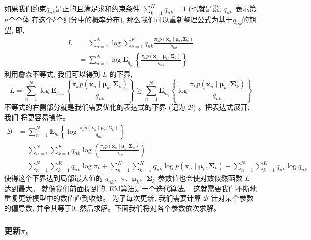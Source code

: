 \documentclass[UTF8]{ctexart}
\numberwithin{equation}{section}
\begin{document}
如果我们约束$q_{n k}$是正的且满足求和约束条件
$\sum_{k=1}^{K} q_{n k}=1$ 
(也就是说, $q_{nk}$ 表示第$n$个个体
在这个$k$个组分中的概率分布), 
那么我们可以重新整理公式为基于$q_{nk}$的期望, 即,
$$
\begin{aligned}
L &=\sum_{n=1}^{N} \log \sum_{k=1}^{K} q_{n k} \frac{\pi_{k} p\left(\boldsymbol{x}_{n} \mid \boldsymbol{\mu}_{k}, \boldsymbol{\Sigma}_{k}\right)}{q_{n k}} \\
&=\sum_{n=1}^{N} \log \boldsymbol{E}_{q_{\mu_{k}}}\left\{\frac{\pi_{k} p\left(\boldsymbol{x}_{n} \mid \boldsymbol{\mu}_{k}, \boldsymbol{\Sigma}_{k}\right)}{q_{n k}}\right\}
\end{aligned}
$$
利用詹森不等式, 我们可以得到 $L$ 的下界,
$$
L=\sum_{n=1}^{N} \log \boldsymbol{E}_{q_{m *}}\left\{\frac{\pi_{k} p\left(\boldsymbol{x}_{n} \mid \boldsymbol{\mu}_{k}, \boldsymbol{\Sigma}_{k}\right)}{q_{n k}}\right\} \geqslant \sum_{n=1}^{N} \boldsymbol{E}_{q_{\tau_{k}}}\left\{\log \frac{\pi_{k} p\left(\boldsymbol{x}_{n} \mid \boldsymbol{\mu}_{k}, \boldsymbol{\Sigma}_{k}\right)}{q_{n k}}\right\}
$$
不等式的右侧部分就是我们需要优化的表达式的下界 (记为 $\mathcal{B})$ 。把表达式展开, 我们 将更容易操作。
$$
\begin{aligned}
\mathcal{B} &=\sum_{n=1}^{N} \boldsymbol{E}_{q_{*}}\left\{\log \frac{\pi_{k} p\left(\boldsymbol{x}_{n} \mid \boldsymbol{\mu}_{k}, \boldsymbol{\Sigma}_{k}\right)}{q_{n k}}\right\} \\
&=\sum_{n=1}^{N} \sum_{k=1}^{K} q_{n k} \log \left(\frac{\pi_{k} p\left(\boldsymbol{x}_{n} \mid \boldsymbol{\mu}_{k}, \boldsymbol{\Sigma}_{k}\right)}{q_{n k}}\right) \\
&=\sum_{n=1}^{N} \sum_{k=1}^{K} q_{n k} \log \pi_{k}+\sum_{n=1}^{N} \sum_{k=1}^{K} q_{n k} \log p\left(\boldsymbol{x}_{n} \mid \boldsymbol{\mu}_{k}, \boldsymbol{\Sigma}_{k}\right)-\sum_{n=1}^{N} \sum_{k=1}^{K} q_{n k} \log q_{n k}
\end{aligned}
$$
使得这个下界达到局部最大值的 $q_{n k} 、 \pi 、 \boldsymbol{\mu}_{k} 、 \boldsymbol{\Sigma}_{k}$ 参数值也会使对数似然函数 $L$ 达到最大。
就像我们前面提到的, EM算法是一个迭代算法。
这就需要我们不断地重复更新模型中的数值直到收敛。
为了每次更新, 我们需要计算 $\mathcal{B}$ 针对某个参数的偏导数, 
并令其等于0, 然后求解。下面我们将对各个参数依次求解。

\subsubsection{更新$\pi_k$}
\end{document}
